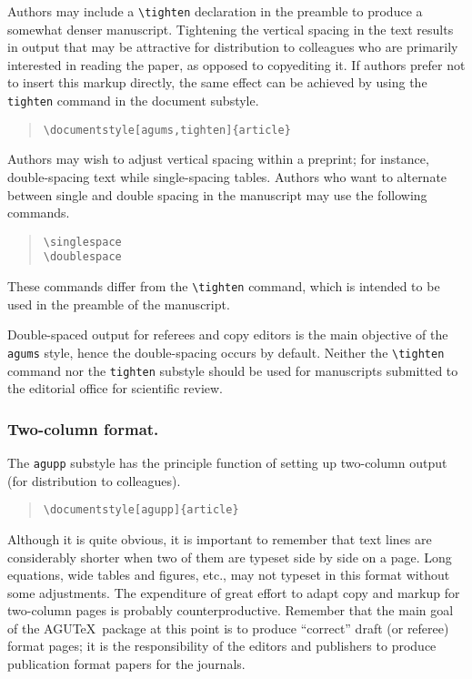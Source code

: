 Authors may include a \verb"\tighten" declaration in the preamble to 
produce a somewhat denser manuscript.  Tightening the vertical spacing 
in the text results in output that may be attractive for distribution 
to colleagues who are primarily interested in reading the paper, as 
opposed to copyediting it.  If authors prefer not to insert this markup 
directly, the same effect can be achieved by using the \verb"tighten" 
command in the document substyle.
\begin{center}
\begin{quote}
\verb"\documentstyle[agums,tighten]{article}"
\end{quote}
\end{center}
Authors may wish to adjust vertical spacing within a preprint;
for instance, double-spacing text while single-spacing tables.
Authors who want to alternate between single and double
spacing in the manuscript may use the following commands.
\begin{quote}
\verb"\singlespace"\\
\verb"\doublespace"
\end{quote}
These commands differ from the \verb"\tighten" command, which 
is intended to be used in the preamble of the manuscript.  

Double-spaced output for referees and copy editors is the main 
objective of the {\tt agums} style, hence the double-spacing occurs by 
default.  Neither the \verb"\tighten" command nor the \verb"tighten"
substyle should be used for manuscripts submitted to the editorial 
office for scientific review.

\subsubsection{Two-column format.}
The {\tt agupp} substyle has the principle function of setting 
up two-column output (for distribution to colleagues).
\begin{quote}
\verb"\documentstyle[agupp]{article}"
\end{quote}
Although it is quite obvious, it is important to remember that 
text lines are considerably shorter when two of them are typeset 
side by side on a page.  Long equations, wide tables and figures, 
etc., may not typeset in this format without some adjustments.  The 
expenditure of great effort to adapt copy and markup for two-column 
pages is probably counterproductive.  Remember that the main goal of 
the AGU\TeX\ package at this point is to produce ``correct'' draft 
(or referee) format pages; it is the responsibility of the editors 
and publishers to produce publication format papers for the journals.


